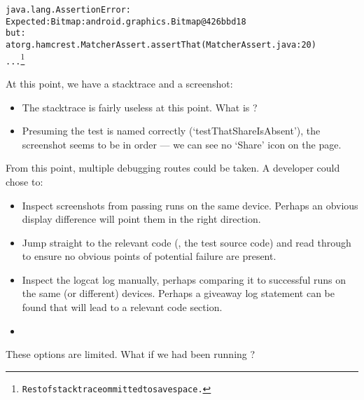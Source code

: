 \begin{alltt}
java.lang.AssertionError:
Expected:  Bitmap: android.graphics.Bitmap@426bbd18
but:
at org.hamcrest.MatcherAssert.assertThat(MatcherAssert.java:20)
...\footnote{Rest of stacktrace ommitted to save space.}
\end{alltt}

At this point, we have a stacktrace and a screenshot:

\begin{itemize}
	\item The stacktrace is fairly useless at this point. What is
	?
	\item Presuming the test is named correctly
	({\lq}testThatShareIsAbsent{\rq}), the screenshot seems to be in order --- we
	can see no {\lq}Share{\rq} icon on the page.
\end{itemize}

From this point, multiple debugging routes could be taken. A developer could
chose to:

\begin{itemize}
	\item Inspect screenshots from passing runs on the same device. Perhaps an
	obvious display difference will point them in the right direction.
	\item Jump straight to the relevant code (\ie, the test source code) and read
	through to ensure no obvious points of potential failure are present.
	\item Inspect the logcat log manually, perhaps comparing it to successful runs
	on the same (or different) devices. Perhaps a giveaway log statement can be
	found that will lead to a relevant code section.
	\item {}
\end{itemize}

These options are limited. What if we had been running \splatter?
